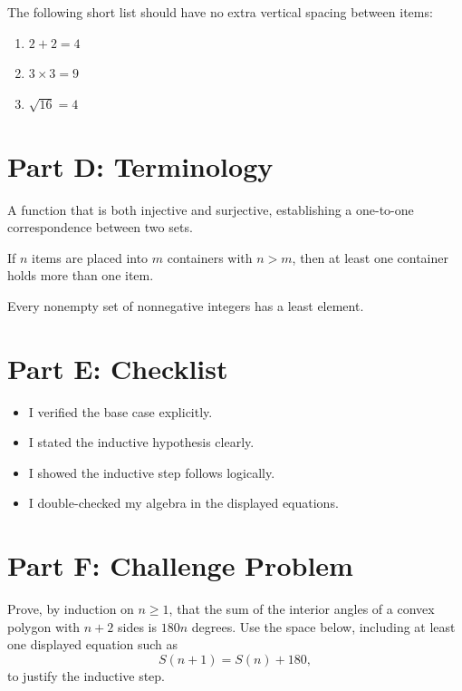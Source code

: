 \documentclass[12pt]{article}
\begin{document}
The following short list should have no extra vertical spacing between
items:

\begin{enumerate}[nosep]
  \item $2 + 2 = 4$
  \item $3 \times 3 = 9$
  \item $\sqrt{16} = 4$
\end{enumerate}

\section*{Part D: Terminology}

\begin{description}[style=nextline]
  \item[Bijection] A function that is both injective and surjective,
        establishing a one-to-one correspondence between two sets.
  \item[Pigeonhole Principle] If $n$ items are placed into $m$ containers
        with $n > m$, then at least one container holds more than one item.
  \item[Well-Ordering Principle] Every nonempty set of nonnegative integers
        has a least element.
\end{description}

\section*{Part E: Checklist}

\begin{itemize}[label=$\square$]
  \item I verified the base case explicitly.
  \item I stated the inductive hypothesis clearly.
  \item I showed the inductive step follows logically.
  \item I double-checked my algebra in the displayed equations.
\end{itemize}

\section*{Part F: Challenge Problem}

Prove, by induction on $n \geq 1$, that the sum of the interior angles of a
convex polygon with $n+2$ sides is $180n$ degrees. Use the space below,
including at least one displayed equation such as
\[
  S(n+1) = S(n) + 180,
\]
to justify the inductive step.

\vspace{2cm}
\hrulefill

\vspace{0.3cm}
\hrulefill
\end{document}
